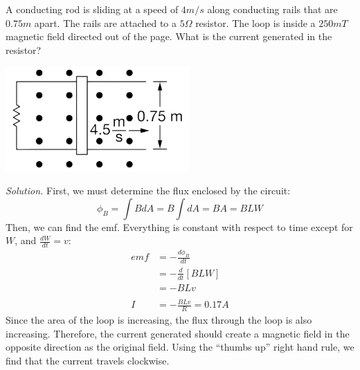 \documentclass[12pt, titlepage]{article}
\begin{document}
\begin{Problem}
    A conducting rod is sliding at a speed of $4 m/s$ along conducting rails that are $0.75m$ apart. The rails are attached to a $5\Omega$ resistor. The loop is inside a $250 mT$ magnetic field directed out of the page. What is the current generated in the resistor?
    \begin{center}
        \includegraphics*[height=4cm]{media/lenz.png}
    \end{center}
    \tcblower
    \textit{Solution.} First, we must determine the flux enclosed by the circuit: 
    \begin{equation*}
        \phi_B = \int BdA = B\int dA = BA = BLW
    \end{equation*}
    Then, we can find the emf. Everything is constant with respect to time except for $W$, and $\frac{dW}{dt} = v$:
    \begin{align*}
        emf &= -\frac{d\phi_B}{dt} \\
        &= -\frac{d}{dt}\left[BLW\right] \\
        &= -BLv \\ \\
        I &= -\frac{BLv}{R} = 0.17A
    \end{align*}
    Since the area of the loop is increasing, the flux through the loop is also increasing. Therefore, the current generated should create a magnetic field in the opposite direction as the original field. Using the ``thumbs up'' right hand rule, we find that the current travels clockwise.
\end{Problem}
\end{document}
